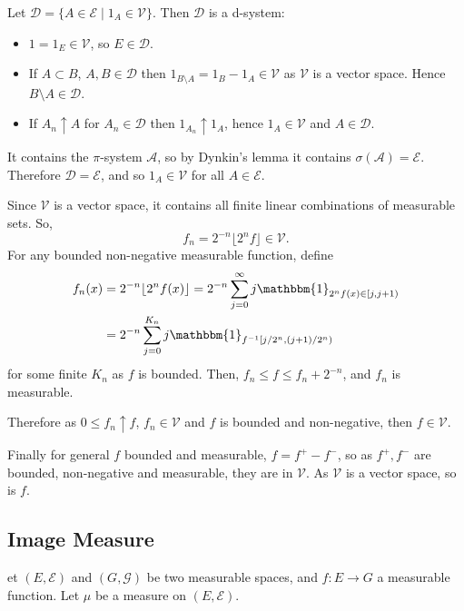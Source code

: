 \documentclass[12pt]{article}
\begin{document}
\begin{proofbox}
	Let $\mathcal{D} = \{A \in \mathcal{E} \mid 1_A \in \mathcal{V}\}$. Then $\mathcal{D}$ is a d-system:
	\begin{itemize}
		\item $1 = 1_E \in \mathcal{V}$, so $E \in \mathcal{D}$.
		\item If $A \subset B$, $A,B \in \mathcal{D}$ then $1_{B\setminus A} = 1_B - 1_A \in \mathcal{V}$ as $\mathcal{V}$ is a vector space. Hence $B\setminus A \in \mathcal{D}$.
		\item If $A_n \uparrow A$ for $A_n \in \mathcal{D}$ then $1_{A_n} \uparrow 1_A$, hence $1_A \in \mathcal{V}$ and $A \in \mathcal{D}$.
	\end{itemize}
	It contains the $\pi$-system $\mathcal{A}$, so by Dynkin's lemma it contains $\sigma(\mathcal{A}) = \mathcal{E}$. Therefore $\mathcal{D} = \mathcal{E}$, and so $1_A \in \mathcal{V}$ for all $A \in \mathcal{E}$.

	Since $\mathcal{V}$ is a vector space, it contains all finite linear combinations of measurable sets. So,
	\[
	f_n = 2^{-n} \lfloor 2^n f \rfloor \in \mathcal{V}.
	\]
	For any bounded non-negative measurable function, define
	\begin{align*}
		f_n(x) &= 2^{-n} \lfloor 2^{n} f(x) \rfloor = 2^{-n} \sum_{j = 0}^{\infty} j \mathbbm{1}_{2^{n}f(x) \in [j,j+1)} \\
		       &= 2^{-n} \sum_{j = 0}^{K_n} j \mathbbm{1}_{f^{-1}[j/2^n, (j+1)/2^n)}
	\end{align*}
	for some finite $K_n$ as $f$ is bounded. Then, $f_n \leq f \leq f_n + 2^{-n}$, and $f_n$ is measurable.

	Therefore as $0 \leq f_n \uparrow f$, $f_n \in \mathcal{V}$ and $f$ is bounded and non-negative, then $f \in \mathcal{V}$.

	Finally for general $f$ bounded and measurable, $f = f^{+} - f^{-}$, so as $f^{+}, f^{-}$ are bounded, non-negative and measurable, they are in $\mathcal{V}$. As $\mathcal{V}$ is a vector space, so is $f$.
\end{proofbox}

\subsection{Image Measure}
\label{sub:image_m}

et $(E, \mathcal{E})$ and $(G, \mathcal{G})$ be two measurable spaces, and $f: E \to G$ a measurable function. Let $\mu$ be a measure on $(E, \mathcal{E})$.
\end{document}
